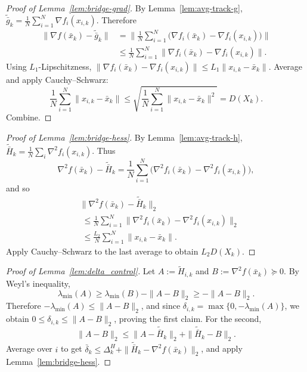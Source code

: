 \documentclass[review,onefignum,onetabnum]{siamart171218}
\begin{document}
	\begin{proof}[Proof of Lemma~\ref{lem:bridge-grad}]
		By Lemma~\ref{lem:avg-track-g}, $\tilde{\bar g}_k=\frac1N\sum_{i=1}^N\nabla f_i(x_{i,k})$.
		Therefore
		\begin{align*}
			\|\nabla f(\bar x_k)\!-\!\tilde{\bar g}_k\|
			&=\Big\|\tfrac1N\textstyle\sum_{i=1}^N\!\big(\nabla f_i(\bar x_k)\!-\!\nabla f_i(x_{i,k})\big)\Big\|\\
			&\le \tfrac1N\textstyle\sum_{i=1}^N \|\nabla f_i(\bar x_k)\!-\!\nabla f_i(x_{i,k})\|.
		\end{align*}
		Using $L_1$-Lipschitzness, $\|\nabla f_i(\bar x_k)-\nabla f_i(x_{i,k})\|\le L_1\|x_{i,k}-\bar x_k\|$.
		Average and apply Cauchy--Schwarz:
		\[
		\frac1N\sum_{i=1}^N\|x_{i,k}-\bar x_k\|
		\le \sqrt{\frac1N\sum_{i=1}^N\|x_{i,k}-\bar x_k\|^2}=D(X_k).
		\]
		Combine.
	\end{proof}
	
	\begin{proof}[Proof of Lemma~\ref{lem:bridge-hess}]
		By Lemma~\ref{lem:avg-track-h}, $\tilde{\bar H}_k=\frac1N\sum_i \nabla^2 f_i(x_{i,k})$.
		Thus
		\[
		\nabla^2 f(\bar x_k)-\tilde{\bar H}_k
		=\frac1N\sum_{i=1}^N\big(\nabla^2 f_i(\bar x_k)-\nabla^2 f_i(x_{i,k})\big),
		\]
		and so
		\begin{align*}
			&\|\nabla^2 f(\bar x_k)\!-\!\tilde{\bar H}_k\|_2\\
			&\;\le \tfrac1N\textstyle\sum_{i=1}^N\|\nabla^2 f_i(\bar x_k)\!-\!\nabla^2 f_i(x_{i,k})\|_2\\
			&\;\le \tfrac{L_2}{N}\textstyle\sum_{i=1}^N\|x_{i,k}\!-\!\bar x_k\|.
		\end{align*}
		Apply Cauchy--Schwarz to the last average to obtain $L_2 D(X_k)$.
	\end{proof}
	
	\begin{proof}[Proof of Lemma~\ref{lem:delta_control}]
		Let $A:=\tilde H_{i,k}$ and $B:=\nabla^2 f(\bar x_k)\succeq0$.
		By Weyl's inequality,
		\[
		\lambda_{\min}(A)\ge \lambda_{\min}(B)-\|A-B\|_2\ge -\|A-B\|_2.
		\]
		Therefore $-\lambda_{\min}(A)\le \|A-B\|_2$, and since $\delta_{i,k}=\max\{0,-\lambda_{\min}(A)\}$,
		we obtain $0\le \delta_{i,k}\le \|A-B\|_2$, proving the first claim.
		For the second,
		\[
		\|A-B\|_2\le \|A-\tilde{\bar H}_k\|_2+\|\tilde{\bar H}_k-B\|_2.
		\]
		Average over $i$ to get $\bar\delta_k\le \Delta_k^H+\|\tilde{\bar H}_k-\nabla^2 f(\bar x_k)\|_2$,
		and apply Lemma~\ref{lem:bridge-hess}.
	\end{proof}
	
\end{document}
